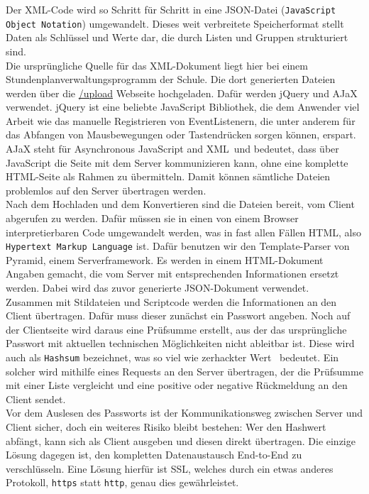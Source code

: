 Der XML-Code wird so Schritt für Schritt in eine JSON-Datei (\texttt{JavaScript Object Notation}) umgewandelt. Dieses weit verbreitete Speicherformat stellt Daten als Schlüssel und Werte dar, die durch Listen und Gruppen strukturiert sind.\\

Die ursprüngliche Quelle für das XML-Dokument liegt hier bei einem Stundenplanverwaltungsprogramm der Schule. Die dort generierten Dateien werden über die \url{/upload} Webseite hochgeladen. Dafür werden jQuery und AJaX verwendet. jQuery ist eine beliebte JavaScript Bibliothek, die dem Anwender viel Arbeit wie das manuelle Registrieren von EventListenern, die unter anderem für das Abfangen von Mausbewegungen oder Tastendrücken sorgen können, erspart. AJaX steht für \glqq Asynchronous JavaScript and XML\grqq\  und bedeutet, dass über JavaScript die Seite mit dem Server kommunizieren kann, ohne eine komplette HTML-Seite als Rahmen zu übermitteln. Damit können sämtliche Dateien problemlos auf den Server übertragen werden.\\

Nach dem Hochladen und dem Konvertieren sind die Dateien bereit, vom Client abgerufen zu werden. Dafür müssen sie in einen von einem Browser interpretierbaren Code umgewandelt werden, was in fast allen Fällen HTML, also \texttt{Hypertext Markup Language} ist. Dafür benutzen wir den Template-Parser von Pyramid, einem Serverframework. Es werden in einem HTML-Dokument Angaben gemacht, die vom Server mit entsprechenden Informationen ersetzt werden. Dabei wird das zuvor generierte JSON-Dokument verwendet.\\

Zusammen mit Stildateien und Scriptcode werden die Informationen an den Client übertragen. Dafür muss dieser zunächst ein Passwort angeben. Noch auf der Clientseite wird daraus eine Prüfsumme erstellt, aus der das ursprüngliche Passwort mit aktuellen technischen Möglichkeiten nicht ableitbar ist. Diese wird auch als \texttt{Hashsum} bezeichnet, was so viel wie \glqq zerhackter Wert \grqq\  bedeutet. Ein solcher wird mithilfe eines Requests an den Server übertragen, der die Prüfsumme mit einer Liste vergleicht und eine positive oder negative Rückmeldung an den Client sendet.\\

Vor dem Auslesen des Passworts ist der Kommunikationsweg zwischen Server und Client sicher, doch ein weiteres Risiko bleibt bestehen: Wer den Hashwert abfängt, kann sich als Client ausgeben und diesen direkt übertragen. Die einzige Lösung dagegen ist, den kompletten Datenaustausch End-to-End zu verschlüsseln. Eine Lösung hierfür ist SSL, welches durch ein etwas  anderes Protokoll, \texttt{https} statt \texttt{http}, genau dies gewährleistet.

